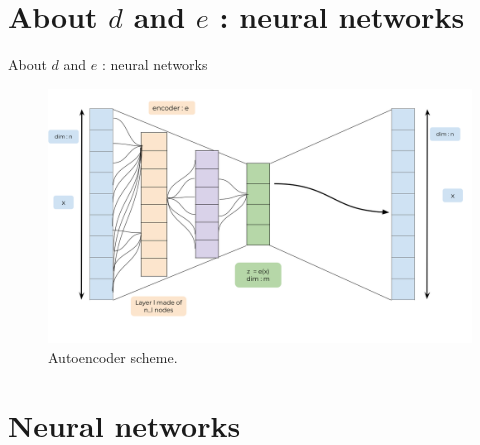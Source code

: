 \documentclass[
  12pt,
  ignorenonframetext,
  compress]{beamer}
\begin{document}
\begin{frame}
\end{frame}

\hypertarget{about-d-and-e-neural-networks}{%
\section{\texorpdfstring{About \(d\) and \(e\) : neural
networks}{About d and e : neural networks}}\label{about-d-and-e-neural-networks}}

\begin{frame}{About \(d\) and \(e\) : neural networks}
\begin{figure}

{\centering \includegraphics[width=0.9\linewidth]{images/Autoencoder2} 

}

\caption{Autoencoder scheme.}\label{fig:unnamed-chunk-4}
\end{figure}
\end{frame}

\begin{frame}
\end{frame}

\hypertarget{neural-networks}{%
\section{Neural networks}\label{neural-networks}}
\end{document}
